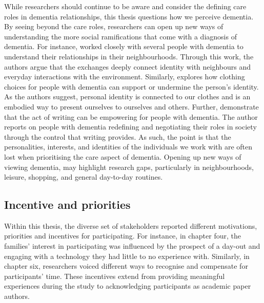 While researchers should continue to be aware and consider the defining care roles in dementia relationships, this thesis questions how we perceive dementia. By seeing beyond the care roles, researchers can open up new ways of understanding the more social ramifications that come with a diagnosis of dementia. For instance, \cite{kullberg2017walking} worked closely with several people with dementia to understand their relationships in their neighbourhoods. Through this work, the authors argue that the exchanges deeply connect identity with neighbours and everyday interactions with the environment. Similarly, \cite{twigg_dress_2013} explores how clothing choices for people with dementia can support or undermine the person's identity. As the authors suggest, personal identity is connected to our clothes and is an embodied way to present ourselves to ourselves and others. Further, \cite{ryan_dementia_2009} demonstrate that the act of writing can be empowering for people with dementia. The author reports on people with dementia redefining and negotiating their roles in society through the control that writing provides. As such, the point is that the personalities, interests, and identities of the individuals we work with are often lost when prioritising the care aspect of dementia. Opening up new ways of viewing dementia, may highlight research gaps, particularly in neighbourhoods, leisure, shopping, and general day-to-day routines.

\subsection{Incentive and priorities }
\label{incentive}
Within this thesis, the diverse set of stakeholders reported different motivations, priorities and incentives for participating. For instance, in chapter four, the families' interest in participating was influenced by the prospect of a day-out and engaging with a technology they had little to no experience with. Similarly, in chapter six, researchers voiced different ways to recognise and compensate for participants' time. These incentives extend from providing meaningful experiences during the study to acknowledging participants as academic paper authors. 

